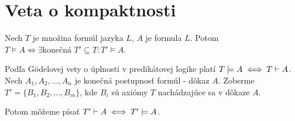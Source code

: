\section{Veta o kompaktnosti}

\begin{veta}[O kompaktnosti]
    Nech $T$ je množina formúl jazyka $L$, $A$ je formula $L$. Potom
    $T \models A \iff \exists \mbox{konečná }T'\subseteq T: T' \models A$.
\end{veta}

\begin{dokaz}
    Podľa G\"odelovej vety o úplnosti v predikátovej logike platí
    $T \models A \iff T \vdash A$.
    Nech $A_1, A_2, \dots , A_n$ je konečná postupnosť formúl -
    dôkaz $A$. Zoberme $T' = \{B_1, B_2, \dots, B_m\}$, kde $B_i$ sú axiómy
    $T$ nachádzajúce sa v dôkaze $A$.

    Potom môžeme písať $T' \vdash A \iff T' \models A$.
\end{dokaz}

